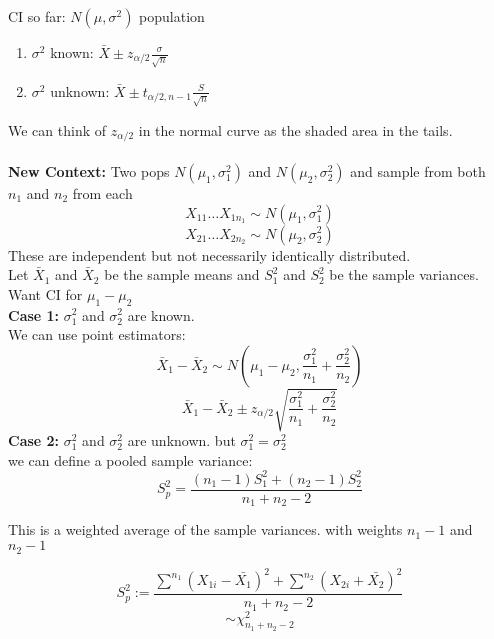 \documentclass[answers,12pt,addpoints]{exam}
\begin{document}
\newpage
CI so far: 
$N(\mu, \sigma^2)$ population
\begin{enumerate}
    \item $\sigma^2$ known: $\bar{X} \pm z_{\alpha/2} \frac{\sigma}{\sqrt{n}}$
    \item $\sigma^2$ unknown: $\bar{X} \pm t_{\alpha/2, n-1} \frac{S}{\sqrt{n}}$
\end{enumerate}
We can think of $z_{\alpha/2}$ in the normal curve as the shaded area in the tails.\\\\
\textbf{New Context:}
Two pops $N(\mu_1, \sigma_1^2)$ and $N(\mu_2, \sigma_2^2)$ and sample from both \\
$n_1$ and $n_2$ from each
$$X_{11} \ldots X_{1n_1} \sim N(\mu_1, \sigma_1^2)$$
$$X_{21} \ldots X_{2n_2} \sim N(\mu_2, \sigma_2^2)$$
These are independent but not necessarily identically distributed.\\
Let $\bar{X}_1$ and $\bar{X}_2$ be the sample means and $S_1^2$ and $S_2^2$ be the sample variances.\\
Want CI for $\mu_1 - \mu_2$\\
\textbf{Case 1: } $\sigma_1^2$ and $\sigma_2^2$ are known.\\
We can use point estimators:
$$\bar{X}_1 - \bar{X}_2 \sim N(\mu_1 - \mu_2 , \frac{\sigma_1^2}{n_1} + \frac{\sigma_2^2}{n_2})$$
$$\bar{X}_1 - \bar{X}_2 \pm z_{\alpha/2} \sqrt{\frac{\sigma_1^2}{n_1} + \frac{\sigma_2^2}{n_2}}$$
\textbf{Case 2: } $\sigma_1^2$ and $\sigma_2^2$ are unknown. but $\sigma_1^2 = \sigma_2^2$\\
we can define a pooled sample variance:
$$S_p^2 = \frac{(n_1 - 1)S_1^2 + (n_2 - 1)S_2^2}{n_1 + n_2 - 2}$$
\begin{remark}
    This is a weighted average of the sample variances. with weights $n_1 - 1$ and $n_2 - 1$
\end{remark}
\begin{remark}
    $$S_p^2 := \frac{\sum^{n_1} (X_{1i} - \bar{X_1})^2 + \sum^{n_2}( X_{2i} + \bar{X_2} )^2}{n_1 + n_2 - 2}$$
    $$ \sim \chi^2_{n_1 + n_2 - 2}$$
\end{remark}
\end{document}
